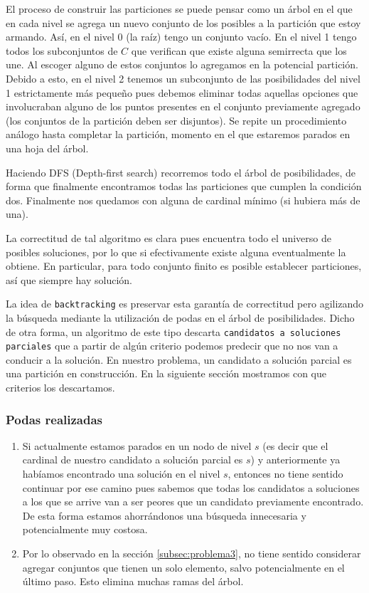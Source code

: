 El proceso de construir las particiones se puede pensar como un árbol en el que en cada nivel se agrega un nuevo conjunto de los posibles a la partición que estoy armando. Así, en el nivel 0 (la raíz) tengo un conjunto vacío. En el nivel 1 tengo todos los subconjuntos de $C$ que verifican que existe alguna semirrecta que los une. Al escoger alguno de estos conjuntos lo agregamos en la potencial partición. Debido a esto, en el nivel 2 tenemos un subconjunto de las posibilidades del nivel 1 estrictamente más pequeño pues debemos eliminar todas aquellas opciones que involucraban alguno de los puntos presentes en el conjunto previamente agregado (los conjuntos de la partición deben ser disjuntos). Se repite un procedimiento análogo hasta completar la partición, momento en el que estaremos parados en una hoja del árbol. 

Haciendo DFS (Depth-first search) recorremos todo el árbol de posibilidades, de forma que finalmente encontramos todas las particiones que cumplen la condición dos. Finalmente nos quedamos con alguna de cardinal mínimo (si hubiera más de una).

La correctitud de tal algoritmo es clara pues encuentra todo el universo de posibles soluciones, por lo que si efectivamente existe alguna eventualmente la obtiene. En particular, para todo conjunto finito es posible establecer particiones, así que siempre hay solución. 

La idea de \texttt{backtracking} es preservar esta garantía de correctitud pero agilizando la búsqueda mediante la utilización de podas en el árbol de posibilidades. Dicho de otra forma, un algoritmo de este tipo descarta \texttt{candidatos a soluciones parciales} que a partir de algún criterio podemos predecir que no nos van a conducir a la solución. En nuestro problema, un candidato a solución parcial es una partición en construcción. En la siguiente sección mostramos con que criterios los descartamos.

\subsubsection{Podas realizadas}
\begin{enumerate}
  \item Si actualmente estamos parados en un nodo de nivel $s$ (es decir que el cardinal de nuestro candidato a solución parcial es $s$) y anteriormente ya habíamos encontrado una solución en el nivel $s$, entonces no tiene sentido continuar por ese camino pues sabemos que todas los candidatos a soluciones a los que se arrive van a ser peores que un candidato previamente encontrado. De esta forma estamos ahorrándonos una búsqueda innecesaria y potencialmente muy costosa.
  \item Por lo observado en la sección \ref{subsec:problema3}, no tiene sentido considerar agregar conjuntos que tienen un solo elemento, salvo potencialmente en el último paso. Esto elimina muchas ramas del árbol.
\end{enumerate}

